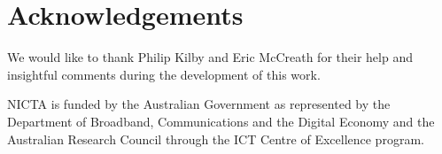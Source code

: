 \section{Acknowledgements}
We would like to thank Philip Kilby and Eric McCreath for their help and insightful comments during the development of this work.
\par \indent
NICTA is funded by the Australian Government as represented by the Department of 
Broadband, Communications and the Digital Economy and the Australian Research 
Council through the ICT Centre of Excellence program.

